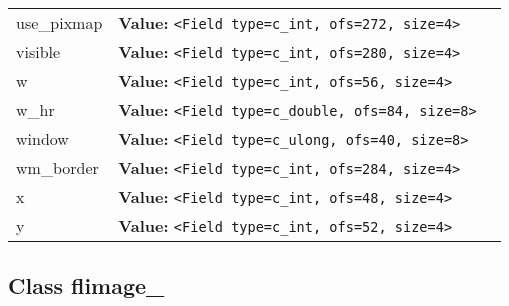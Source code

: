 \begin{longtable}{|p{\varnamewidth}|p{\vardescrwidth}|l}
\raggedright u\-s\-e\-\_\-p\-i\-x\-m\-a\-p\- & \raggedright \textbf{Value:} 
{\tt {\textless}Field type=c\_int, ofs=272, size=4{\textgreater}}&\\
\cline{1-2}
\raggedright v\-i\-s\-i\-b\-l\-e\- & \raggedright \textbf{Value:} 
{\tt {\textless}Field type=c\_int, ofs=280, size=4{\textgreater}}&\\
\cline{1-2}
\raggedright w\- & \raggedright \textbf{Value:} 
{\tt {\textless}Field type=c\_int, ofs=56, size=4{\textgreater}}&\\
\cline{1-2}
\raggedright w\-\_\-h\-r\- & \raggedright \textbf{Value:} 
{\tt {\textless}Field type=c\_double, ofs=84, size=8{\textgreater}}&\\
\cline{1-2}
\raggedright w\-i\-n\-d\-o\-w\- & \raggedright \textbf{Value:} 
{\tt {\textless}Field type=c\_ulong, ofs=40, size=8{\textgreater}}&\\
\cline{1-2}
\raggedright w\-m\-\_\-b\-o\-r\-d\-e\-r\- & \raggedright \textbf{Value:} 
{\tt {\textless}Field type=c\_int, ofs=284, size=4{\textgreater}}&\\
\cline{1-2}
\raggedright x\- & \raggedright \textbf{Value:} 
{\tt {\textless}Field type=c\_int, ofs=48, size=4{\textgreater}}&\\
\cline{1-2}
\raggedright y\- & \raggedright \textbf{Value:} 
{\tt {\textless}Field type=c\_int, ofs=52, size=4{\textgreater}}&\\
\cline{1-2}
\end{longtable}



\subsection{Class flimage\_}

